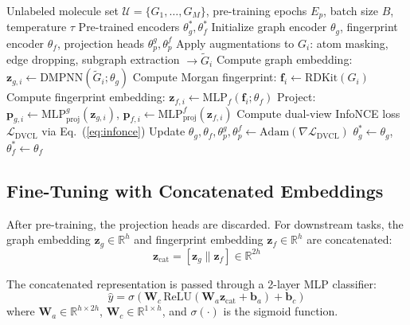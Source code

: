 \documentclass[a4paper,fleqn]{cas-sc}
\begin{document}
\begin{algorithm}[!t]
\caption{DVCL Dual-View Contrastive Pre-Training}
\label{alg:pretrain}
\begin{algorithmic}[1]
\REQUIRE Unlabeled molecule set $\mathcal{U} = \{G_1, \ldots, G_M\}$, pre-training epochs $E_p$, batch size $B$, temperature $\tau$
\ENSURE Pre-trained encoders $\theta_g^*, \theta_f^*$
\STATE Initialize graph encoder $\theta_g$, fingerprint encoder $\theta_f$, projection heads $\theta_p^g, \theta_p^f$
            \STATE Apply augmentations to $G_i$: atom masking, edge dropping, subgraph extraction $\rightarrow \tilde{G}_i$
            \STATE Compute graph embedding: $\mathbf{z}_{g,i} \leftarrow \text{DMPNN}(\tilde{G}_i; \theta_g)$
            \STATE Compute Morgan fingerprint: $\mathbf{f}_i \leftarrow \text{RDKit}(G_i)$
            \STATE Compute fingerprint embedding: $\mathbf{z}_{f,i} \leftarrow \text{MLP}_f(\mathbf{f}_i; \theta_f)$
            \STATE Project: $\mathbf{p}_{g,i} \leftarrow \text{MLP}_{\text{proj}}^g(\mathbf{z}_{g,i})$, $\mathbf{p}_{f,i} \leftarrow \text{MLP}_{\text{proj}}^f(\mathbf{z}_{f,i})$
        \ENDFOR
        \STATE Compute dual-view InfoNCE loss $\mathcal{L}_{\text{DVCL}}$ via Eq.~(\ref{eq:infonce})
        \STATE Update $\theta_g, \theta_f, \theta_p^g, \theta_p^f \leftarrow \text{Adam}(\nabla \mathcal{L}_{\text{DVCL}})$
    \ENDFOR
\ENDFOR
\RETURN $\theta_g^* \leftarrow \theta_g$, $\theta_f^* \leftarrow \theta_f$
\end{algorithmic}
\end{algorithm}

\subsection{Fine-Tuning with Concatenated Embeddings}\label{sec:finetuning}

After pre-training, the projection heads are discarded. For downstream tasks, the graph embedding $\mathbf{z}_g \in \mathbb{R}^{h}$ and fingerprint embedding $\mathbf{z}_f \in \mathbb{R}^{h}$ are concatenated:
\begin{equation}\label{eq:concat}
\mathbf{z}_{\text{cat}} = [\mathbf{z}_g \| \mathbf{z}_f] \in \mathbb{R}^{2h}
\end{equation}

The concatenated representation is passed through a 2-layer MLP classifier:
\begin{equation}\label{eq:classifier}
\hat{y} = \sigma\left(\mathbf{W}_c \, \text{ReLU}\left(\mathbf{W}_a \mathbf{z}_{\text{cat}} + \mathbf{b}_a\right) + \mathbf{b}_c\right)
\end{equation}
where $\mathbf{W}_a \in \mathbb{R}^{h \times 2h}$, $\mathbf{W}_c \in \mathbb{R}^{1 \times h}$, and $\sigma(\cdot)$ is the sigmoid function.
\end{document}
